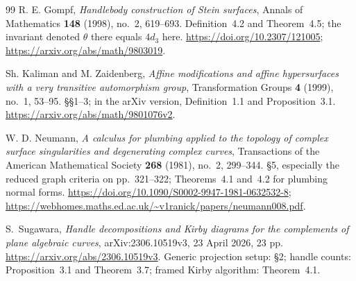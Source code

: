\begin{thebibliography}{99}
R. E. Gompf,
\emph{Handlebody construction of Stein surfaces},
Annals of Mathematics \textbf{148} (1998), no.~2, 619--693.
Definition~4.2 and Theorem~4.5; the invariant denoted $\theta$ there equals $4d_3$ here.
\url{https://doi.org/10.2307/121005};
\url{https://arxiv.org/abs/math/9803019}.

Sh. Kaliman and M. Zaidenberg,
\emph{Affine modifications and affine hypersurfaces with a very transitive automorphism group},
Transformation Groups \textbf{4} (1999), no.~1, 53--95.
\S\S1--3; in the arXiv version, Definition~1.1 and Proposition~3.1.
\url{https://arxiv.org/abs/math/9801076v2}.

W. D. Neumann,
\emph{A calculus for plumbing applied to the topology of complex surface singularities
and degenerating complex curves},
Transactions of the American Mathematical Society \textbf{268} (1981), no.~2, 299--344.
\S5, especially the reduced graph criteria on pp.~321--322;
Theorems~4.1 and~4.2 for plumbing normal forms.
\url{https://doi.org/10.1090/S0002-9947-1981-0632532-8};
\url{https://webhomes.maths.ed.ac.uk/~v1ranick/papers/neumann008.pdf}.

S.~Sugawara,
\emph{Handle decompositions and Kirby diagrams for the complements of plane algebraic curves},
arXiv:2306.10519v3, 23 April 2026, 23 pp.
\url{https://arxiv.org/abs/2306.10519v3}.
Generic projection setup: \S2; handle counts: Proposition~3.1 and Theorem~3.7;
framed Kirby algorithm: Theorem~4.1.



\end{thebibliography}

